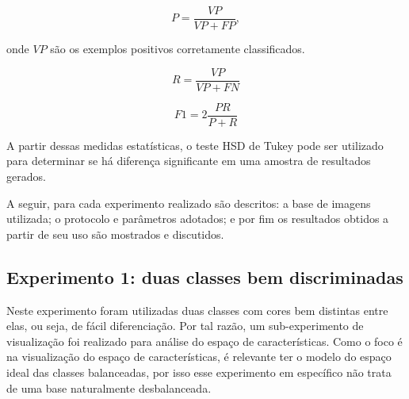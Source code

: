 \begin{equation}
  P = \frac{VP}{VP + FP},
  \label{precisao}
\end{equation}

\noindent onde $VP$ são os exemplos positivos corretamente classificados.

\begin{equation}
  R = \frac{VP}{VP + FN}
  \label{revocacao}
\end{equation}

\begin{equation}
  F1 = 2 \frac{PR}{P+R}
  \label{medidaf}
\end{equation}

A partir dessas medidas estatísticas, o teste HSD de Tukey pode ser utilizado para determinar se há diferença significante em uma amostra de resultados gerados.


A seguir, para cada experimento realizado são descritos: a base de imagens utilizada; o protocolo e parâmetros adotados; e por fim os resultados obtidos a partir de seu uso são mostrados e discutidos.

\FloatBarrier
\subsection{Experimento 1: duas classes bem discriminadas}

Neste experimento foram utilizadas duas classes com cores bem distintas entre elas, ou seja, de fácil diferenciação. Por tal razão, um sub-experimento de visualização foi realizado para análise do espaço de características. Como o foco é na visualização do espaço de características, é relevante ter o modelo do espaço ideal das classes balanceadas, por isso esse experimento em específico não trata de uma base naturalmente desbalanceada.


